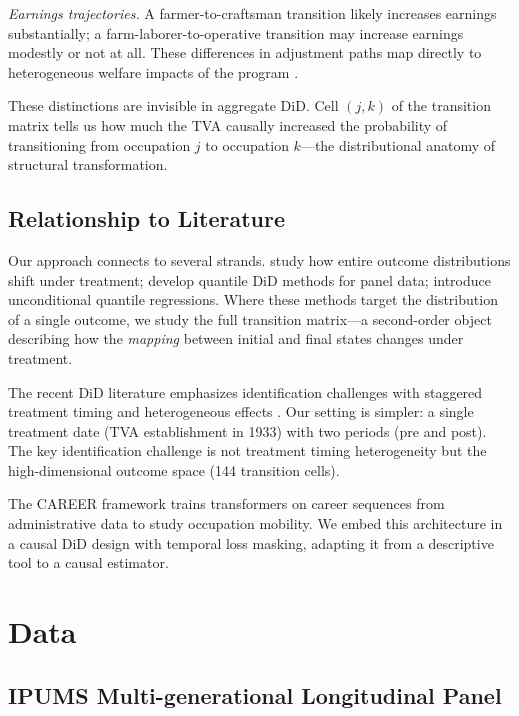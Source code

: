 \documentclass[12pt]{article}
\begin{document}
\textit{Earnings trajectories.} A farmer-to-craftsman transition likely increases earnings substantially; a farm-laborer-to-operative transition may increase earnings modestly or not at all. These differences in adjustment paths map directly to heterogeneous welfare impacts of the program \citep{chetty2014}.

These distinctions are invisible in aggregate DiD. Cell $(j,k)$ of the transition matrix tells us how much the TVA causally increased the probability of transitioning from occupation $j$ to occupation $k$---the distributional anatomy of structural transformation.

\subsection{Relationship to Literature}

Our approach connects to several strands. \citet{athey2006} study how entire outcome distributions shift under treatment; \citet{callaway2019} develop quantile DiD methods for panel data; \citet{firpo2009} introduce unconditional quantile regressions. Where these methods target the distribution of a single outcome, we study the full transition matrix---a second-order object describing how the \textit{mapping} between initial and final states changes under treatment.

The recent DiD literature emphasizes identification challenges with staggered treatment timing and heterogeneous effects \citep{roth2023, callaway2021, dechaisemartin2020, borusyak2024, sunabraham2021}. Our setting is simpler: a single treatment date (TVA establishment in 1933) with two periods (pre and post). The key identification challenge is not treatment timing heterogeneity but the high-dimensional outcome space (144 transition cells).

The CAREER framework \citep{vafa2022} trains transformers on career sequences from administrative data to study occupation mobility. We embed this architecture in a causal DiD design with temporal loss masking, adapting it from a descriptive tool to a causal estimator.


\section{Data}
\label{sec:data}

\subsection{IPUMS Multi-generational Longitudinal Panel}
\end{document}
